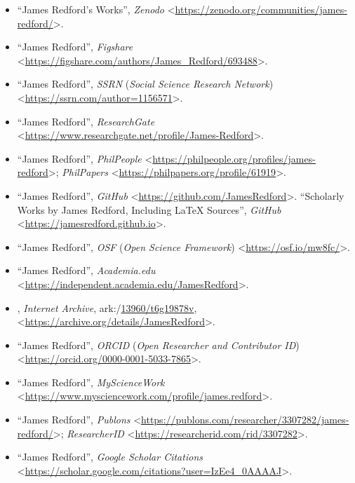 \documentclass[letterpaper,11pt]{article}
\newcommand{\dsc}{\discretionary{}{}{}}
\begin{document}
\begin{itemize}
\small
\item ``James Redford's Works'', \emph{Zenodo} \textless\url{https://zenodo.org/communities/james-redford/}\textgreater .

\item ``James Redford'', \emph{Figshare} \textless\url{https://figshare.com/authors/James_Redford/693488}\textgreater .

\item ``James Redford'', \emph{SSRN} (\emph{Social Science Research Network}) \textless\url{https://ssrn.com/author=1156571}\textgreater .

\item ``James Redford'', \emph{ResearchGate} \textless\url{https://www.researchgate.net/profile/James-Redford}\textgreater .

\item ``James Redford'', \emph{PhilPeople} \textless\url{https://philpeople.org/profiles/james-redford}\textgreater ; \emph{PhilPapers} \textless\href{https://philpapers.org/profile/61919}{https\dsc :\dsc //\dsc phil\dsc papers\dsc .org/\dsc profile/\dsc 61919}\textgreater .

\item ``James Redford'', \emph{GitHub} \textless\url{https://github.com/JamesRedford}\textgreater . ``Scholarly Works by James Redford, Including LaTeX Sources'', \emph{GitHub} \textless\url{https://jamesredford.github.io}\textgreater .

\item ``James Redford'', \emph{OSF} (\emph{Open Science Framework}) \textless\url{https://osf.io/mw8fc/}\textgreater .

\item ``James Redford'', \emph{Academia.edu} \textless\url{https://independent.academia.edu/JamesRedford}\textgreater .

\item {}, \emph{Internet Archive}, ark:/\discretionary{}{}{}\href{https://n2t.net/ark:/13960/t6g19878v}{13960/\dsc t6g19878v}, \textless\url{https://archive.org/details/JamesRedford}\textgreater .

\item ``James Redford'', \emph{ORCID} (\emph{Open Researcher and Contributor ID}) \textless\url{https://orcid.org/0000-0001-5033-7865}\textgreater .

\item ``James Redford'', \emph{MyScienceWork} \textless\url{https://www.mysciencework.com/profile/james.redford}\textgreater .

\item ``James Redford'', \emph{Publons} \textless\url{https://publons.com/researcher/3307282/james-redford/}\textgreater ; \emph{Researcher\dsc ID} \textless\url{https://researcherid.com/rid/3307282}\textgreater .

\item ``James Redford'', \emph{Google Scholar Citations} \textless\url{https://scholar.google.com/citations?user=IzEe4_0AAAAJ}\textgreater .
\end{itemize}
\end{document}
